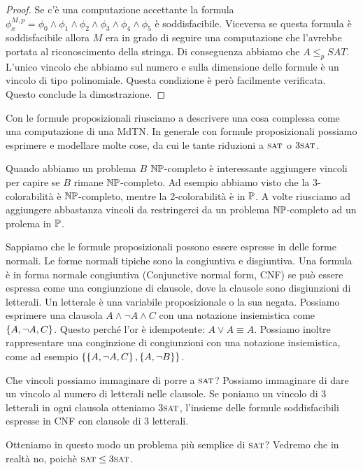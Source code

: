 \begin{proof}
    Se c'è una computazione accettante la formula $\phi_{x}^{M,p} = \phi_{0} \land \phi_{1} \land
    \phi_{2} \land \phi_{3} \land \phi_{4} \land \phi_{5}$ è soddisfacibile. Viceversa se questa
    formula è soddisfacibile allora $M$ era in grado di seguire una computazione che l'avrebbe
    portata al riconoscimento della stringa. Di conseguenza abbiamo che $A \leq_{p} SAT$. L'unico
    vincolo che abbiamo sul numero e sulla dimensione delle formule è un vincolo di tipo
    polinomiale. Questa condizione è però facilmente verificata. Questo conclude la dimostrazione.

\end{proof}

Con le formule proposizionali riusciamo a descrivere una cosa complessa come una computazione di una
MdTN. In generale con formule proposizionali possiamo esprimere e modellare molte cose, da cui le
tante riduzioni a $\textsc{sat}$ o $3\textsc{sat}$.

Quando abbiamo un problema $B$ $\mathbb{NP}$-completo è interessante aggiungere vincoli per capire se
$B$ rimane $\mathbb{NP}$-completo. Ad esempio abbiamo visto che la 3-colorabilità è
$\mathbb{NP}$-completo, mentre la 2-colorabilità è in $\mathbb{P}$. A volte riusciamo ad aggiungere
abbastanza vincoli da restringerci da un problema $\mathbb{NP}$-completo ad un prolema in $\mathbb{P}$.

Sappiamo che le formule proposizionali possono essere espresse in delle forme normali. Le forme
normali tipiche sono la congiuntiva e disgiuntiva.  Una formula è in forma normale congiuntiva
(Conjunctive normal form, CNF) se può essere espressa come una congiunzione di clausole, dove la
clausole sono disgiunzioni di letterali. Un letterale è una variabile proposizionale o la sua
negata. Possiamo esprimere una clausola $A \land \lnot A \land C$ con una notazione insiemistica
come $\left\{A,\lnot A,C\right\}$. Questo perché l'or è idempotente: $A \lor A \equiv A$. Possiamo inoltre
rappresentare una conginzione di congiunzioni con una notazione insiemistica, come ad esempio
$\left\{\left\{A,\lnot A,C\right\},\left\{A,\lnot B\right\}\right\}$.

Che vincoli possiamo immaginare di porre a $\textsc{sat}$? Possiamo immaginare di dare un vincolo al numero
di letterali nelle clausole. Se poniamo un vincolo di 3 letterali in ogni clausola otteniamo
$3\textsc{sat}$, l'insieme delle formule soddisfacibili espresse in CNF con clausole di 3 letterali.

Otteniamo in questo modo un problema più semplice di $\textsc{sat}$? Vedremo che in realtà no, poichè
$\textsc{sat} \leq 3\textsc{sat}$.

